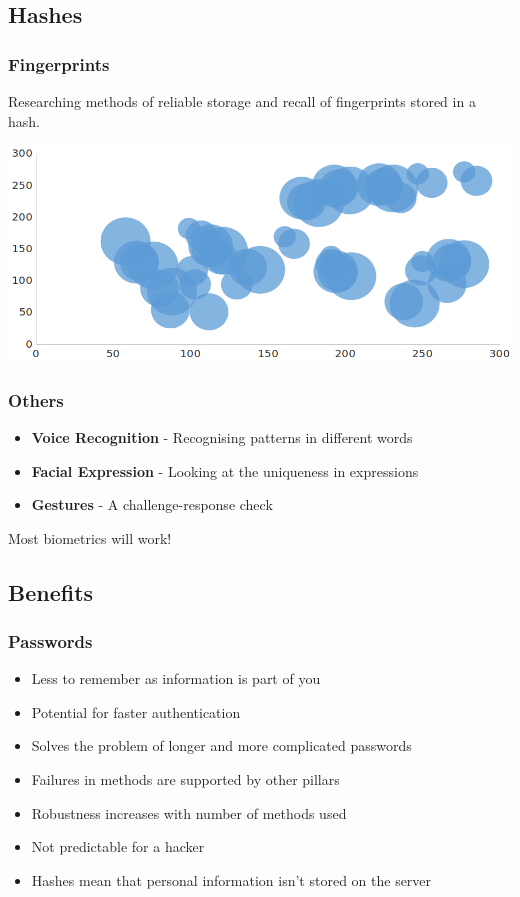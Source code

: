 \documentclass{beamer}
\begin{document}
    \subsection{Hashes}
      \begin{frame}
        \frametitle{Fingerprints}
        Researching methods of reliable storage and recall of fingerprints
        stored in a hash.
        \vfill
        \begin{center}
          \includegraphics[scale=0.3]{finger-graph}
        \end{center}
      \end{frame}
      \begin{frame}
        \frametitle{Others}
        \begin{itemize}
          \item \textbf{Voice Recognition} - Recognising patterns in different
                words
          \item \textbf{Facial Expression} - Looking at the uniqueness in
                expressions
          \item \textbf{Gestures} - A challenge-response check
        \end{itemize}
        \vfill
        Most biometrics will work!
      \end{frame}
    \subsection{Benefits}
      \begin{frame}
        \frametitle{Passwords}
        \begin{itemize}
          \item Less to remember as information is part of you
          \item Potential for faster authentication
          \item Solves the problem of longer and more complicated passwords
          \item Failures in methods are supported by other pillars
          \item Robustness increases with number of methods used
          \item Not predictable for a hacker
          \item Hashes mean that personal information isn't stored on the server
        \end{itemize}
      \end{frame}
\end{document}

